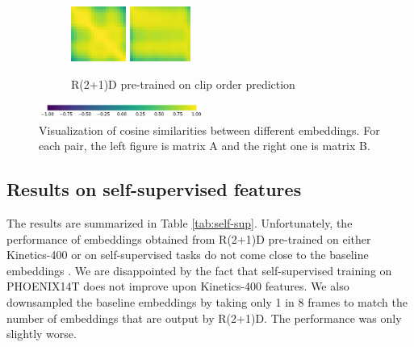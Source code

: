 \documentclass[final]{cvpr}
\begin{document}
\begin{figure}[t]
\begin{subfigure}[t]{0.5\linewidth}
	\end{subfigure}\hfill
	\begin{subfigure}[t]{0.5\linewidth}
		\centering\captionsetup{width=.9\linewidth, justification=raggedright}
		\includegraphics[height=1.8cm]{fig/matrices/a_vcop}
		\includegraphics[height=1.8cm]{fig/matrices/b_vcop}
		\caption{\centering R(2+1)D pre-trained on clip order prediction}
	\end{subfigure}
	\par\medskip
	\centering
	\includegraphics[width=0.48\textwidth]{fig/colorbar}
	\caption{Visualization of cosine similarities between different embeddings. For each pair, the left figure is matrix A and the right one is matrix B.}
	\label{fig:self_supervised_embeddings}
\end{figure}

\subsection{Results on self-supervised features}
The results are summarized in Table \ref{tab:self-sup}. Unfortunately, the performance of embeddings obtained from R(2+1)D pre-trained on either Kinetics-400 or on self-supervised tasks do not come close to the baseline embeddings \cite{hmm}. We are disappointed by the fact that self-supervised training on PHOENIX14T does not improve upon Kinetics-400 features. We also downsampled the baseline embeddings by taking only 1 in 8 frames to match the number of embeddings that are output by R(2+1)D. The performance was only slightly worse.
\end{document}
